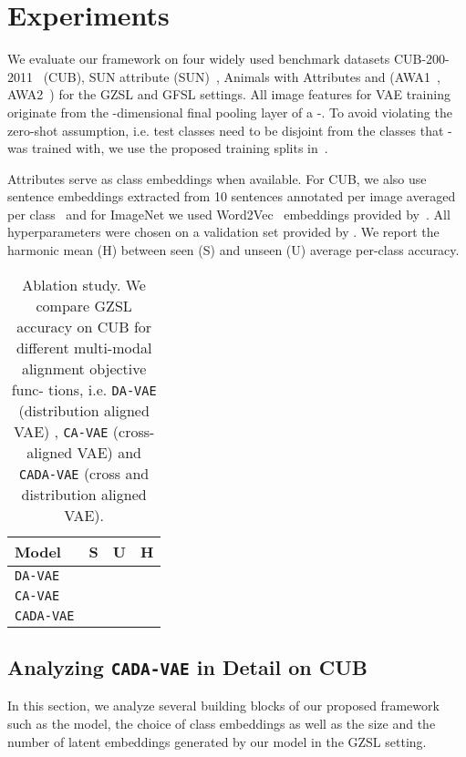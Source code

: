 \documentclass[10pt,twocolumn,letterpaper]{article}
\begin{document}
\section{Experiments}
\label{sec:exp}
We evaluate our framework on four widely used benchmark datasets CUB-200-2011~\cite{cub} (CUB), SUN attribute (SUN)~\cite{sun}, Animals with Attributes  and  (AWA1~\cite{DAP}, AWA2~\cite{goodbadugly}) for the GZSL and GFSL settings.
All image features for VAE training originate from the -dimensional final pooling layer of a -. To avoid violating the zero-shot assumption, i.e. test classes need to be disjoint from the classes that - was trained with, we use the proposed training splits in~\cite{goodbadugly}.

Attributes serve as class embeddings when available. For CUB, we also use sentence embeddings extracted from 10 sentences annotated per image averaged per class~\cite{reed} and for ImageNet we used Word2Vec~\cite{mikolov2013distributed} embeddings provided by~\cite{sync}.
All hyperparameters were chosen on a validation set provided by \cite{goodbadugly}. We report the harmonic mean (H) between seen (S) and unseen (U) average per-class accuracy.

{
\setlength{\tabcolsep}{6pt}
\renewcommand{\arraystretch}{1.2}
\begin{center}
\centering
\begin{table}[t]
\centering
\begin{tabular}{ l ccc}
 Model & \textbf{S}  & \textbf{U}  & \textbf{H} \\
 \hline
\texttt{DA-VAE} &  &  &  \\
\texttt{CA-VAE} &  &  &  \\
\texttt{CADA-VAE} &  &  &  \\
\end{tabular}
\caption{Ablation study. We compare GZSL accuracy on
CUB for different multi-modal alignment objective func-
tions, i.e. \texttt{DA-VAE} (distribution aligned VAE)
, \texttt{CA-VAE} (cross-aligned VAE) 
and \texttt{CADA-VAE} (cross and distribution aligned VAE).}
\label{table:ablation}
\end{table}
\end{center}
}


\vspace{-10mm}
\subsection{Analyzing \textbf{\texttt{CADA-VAE}} in Detail on CUB} 
\label{sec:cub-analysis}
In this section, we analyze several building blocks of our proposed framework such as the model, the choice of class embeddings as well as the size and the number of latent embeddings generated by our model in the GZSL setting.
\end{document}
